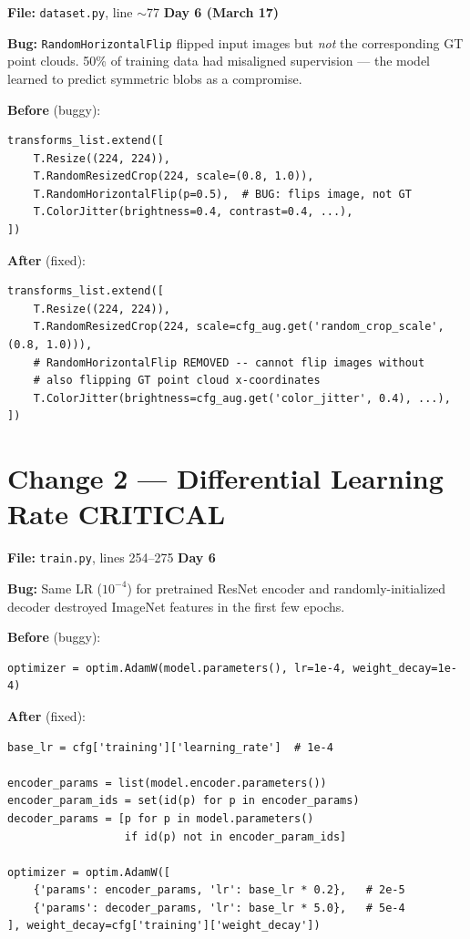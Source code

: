\documentclass[10pt,a4paper]{article}
\begin{document}
\textbf{File:} \texttt{dataset.py}, line $\sim$77 \hfill \textbf{Day 6 (March 17)}

\textbf{Bug:} \texttt{RandomHorizontalFlip} flipped input images but \textit{not} the corresponding GT point clouds. 50\% of training data had misaligned supervision --- the model learned to predict symmetric blobs as a compromise.

\vspace{4pt}
\textbf{Before} \textcolor{bugred}{(buggy)}:
\begin{lstlisting}
transforms_list.extend([
    T.Resize((224, 224)),
    T.RandomResizedCrop(224, scale=(0.8, 1.0)),
    T.RandomHorizontalFlip(p=0.5),  # BUG: flips image, not GT
    T.ColorJitter(brightness=0.4, contrast=0.4, ...),
])
\end{lstlisting}

\textbf{After} \textcolor{fixgreen}{(fixed)}:
\begin{lstlisting}
transforms_list.extend([
    T.Resize((224, 224)),
    T.RandomResizedCrop(224, scale=cfg_aug.get('random_crop_scale', (0.8, 1.0))),
    # RandomHorizontalFlip REMOVED -- cannot flip images without
    # also flipping GT point cloud x-coordinates
    T.ColorJitter(brightness=cfg_aug.get('color_jitter', 0.4), ...),
])
\end{lstlisting}

\section*{Change 2 --- Differential Learning Rate \hfill \normalfont\small\textcolor{bugred}{CRITICAL}}

\textbf{File:} \texttt{train.py}, lines 254--275 \hfill \textbf{Day 6}

\textbf{Bug:} Same LR ($10^{-4}$) for pretrained ResNet encoder and randomly-initialized decoder destroyed ImageNet features in the first few epochs.

\vspace{4pt}
\textbf{Before} \textcolor{bugred}{(buggy)}:
\begin{lstlisting}
optimizer = optim.AdamW(model.parameters(), lr=1e-4, weight_decay=1e-4)
\end{lstlisting}

\textbf{After} \textcolor{fixgreen}{(fixed)}:
\begin{lstlisting}
base_lr = cfg['training']['learning_rate']  # 1e-4

encoder_params = list(model.encoder.parameters())
encoder_param_ids = set(id(p) for p in encoder_params)
decoder_params = [p for p in model.parameters()
                  if id(p) not in encoder_param_ids]

optimizer = optim.AdamW([
    {'params': encoder_params, 'lr': base_lr * 0.2},   # 2e-5
    {'params': decoder_params, 'lr': base_lr * 5.0},   # 5e-4
], weight_decay=cfg['training']['weight_decay'])
\end{lstlisting}
\end{document}
